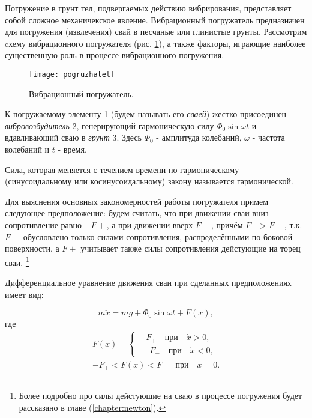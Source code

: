 Погружение в грунт тел, подвергаемых действию вибрирования, представляет собой сложное механичекское явление. Вибрационный
погружатель предназначен для погружения (извлечения) свай в песчаные или глинистые грунты. Рассмотрим cхему вибрационного
погружателя (рис. \ref{fig:vp}), а также факторы, играющие наиболее существенную роль в процессе вибрационного погружения.

\begin{figure}[h]
    \centering
    \texttt{[image: pogruzhatel]}
    \caption{Вибрационный погружатель.}
    \label{fig:vp}
\end{figure}

\noindent К погружаемому элементу 1 (будем называть его \textit{сваей}) жестко присоединен \textit{вибровозбудитель} 2,
генерирующий гармоническую силу $\Phi_0 \sin \omega t$ и вдавливающий сваю в \textit{грунт} 3. Здесь $\Phi_0$ - амплитуда
колебаний, $\omega$ - частота колебаний и $t$ - время.

\begin{definition}
    Сила, которая меняется с течением времени по гармоническому (синусоидальному или косинусоидальному)
    закону называется гармонической.
\end{definition}

Для выяснения основных закономерностей работы погружателя примем следующее предположение: будем считать, что
при движении сваи вниз сопротивление равно $-F+$, а при движении вверх $F-$, причём $F+ > F-$, т.к. $F-$ обусловлено только
силами сопротивления, распределёнными по боковой поверхности, а $F+$ учитывает также силы сопротивления дейстующие на
торец сваи. \footnote{Более подробно про силы дейстующие на сваю в процессе погружения будет рассказано
в главе (\ref{chapter:newton}).}

Дифференциальное уравнение движения сваи при сделанных предположениях имеет вид:

\begin{equation}
    m\ddot{x} = mg + \Phi_0 \sin \omega t + F(\dot{x}),
\end{equation}
где
\begin{equation}
    \begin{aligned}
        F(\dot{x}) =
        \begin{cases}
            -F_+ \quad \text{при} \quad \dot{x} > 0,\\
            \phantom{-}F_- \quad \text{при} \quad \dot{x} < 0,
        \end{cases}\\
        -F_+ < F(\dot{x}) < F_- \quad \text{при} \quad \dot{x} = 0.
    \end{aligned}
\end{equation}

